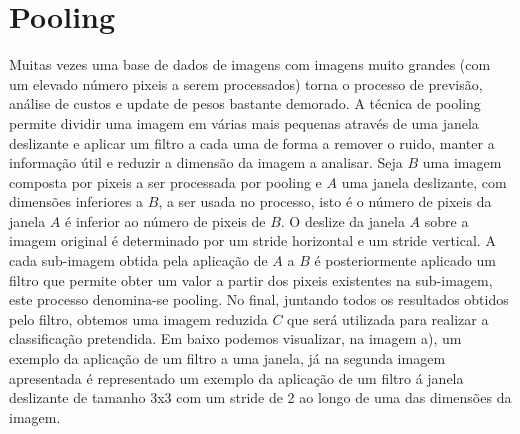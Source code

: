 \begin{center}
\end{center}




\section{Pooling}

Muitas vezes uma base de dados de imagens com imagens muito grandes (com um elevado número pixeis a serem processados) torna o processo de previsão, análise de custos e update de pesos bastante demorado\cite{ref8}.\newline
A técnica de pooling permite dividir uma imagem em várias mais pequenas através de uma janela deslizante e aplicar um filtro a cada uma de forma a remover o ruido, manter a informação útil e reduzir a dimensão da imagem a analisar\cite{ref8}.\newline
Seja $B$ uma imagem composta por pixeis a ser processada por pooling e $A$ uma janela deslizante, com dimensões inferiores a $B$, a ser usada no processo, isto é o número de pixeis da janela $A$ é inferior ao número de pixeis de $B$.\newline
O deslize da janela $A$ sobre a imagem original é determinado por um stride horizontal e um stride vertical. A cada sub-imagem obtida pela aplicação de $A$ a $B$ é posteriormente aplicado um filtro que permite obter um valor a partir dos pixeis existentes na sub-imagem, este processo denomina-se pooling. No final, juntando todos os resultados obtidos pelo filtro, obtemos uma imagem reduzida $C$ que será utilizada para realizar a classificação pretendida.\newline
Em baixo podemos visualizar, na imagem a), um exemplo da aplicação de um filtro a uma janela\cite{ref8}, já na segunda imagem apresentada é representado um exemplo da aplicação de um filtro á janela deslizante de tamanho 3x3 com um stride de 2 ao longo de uma das dimensões da imagem\cite{ref8}.


